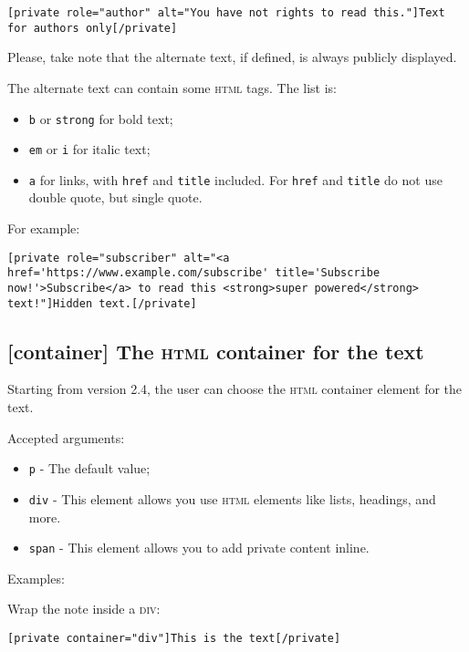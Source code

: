 \documentclass[a4paper,10pt]{article}
\begin{document}
\begin{lstlisting}
[private role="author" alt="You have not rights to read this."]Text for authors only[/private]
\end{lstlisting}

Please, take note that the alternate text, if defined, is always publicly displayed.

The alternate text can contain some \textsc{html} tags. The list is:

\begin{itemize}
 \item \verb+b+ or \verb+strong+ for bold text;
 \item \verb+em+ or \verb+i+ for italic text;
 \item \verb+a+ for links, with \verb+href+ and \verb+title+ included. For \verb+href+ and \verb+title+ do not use double quote, but single quote.
\end{itemize}

For example:

\begin{lstlisting}
[private role="subscriber" alt="<a href='https://www.example.com/subscribe' title='Subscribe now!'>Subscribe</a> to read this <strong>super powered</strong> text!"]Hidden text.[/private]
\end{lstlisting}

\subsection{[container] The \textsc{html} container for the text}

Starting from version 2.4, the user can choose the \textsc{html} container element for the text.

Accepted arguments:

\begin{itemize}
 \item \verb+p+ - The default value;
 \item \verb+div+ - This element allows you use \textsc{html} elements like lists, headings, and more.
 \item \verb+span+ - This element allows you to add private content inline.
\end{itemize}

Examples:

Wrap the note inside a \textsc{div}:

\begin{lstlisting}
[private container="div"]This is the text[/private]
\end{lstlisting}
\end{document}
